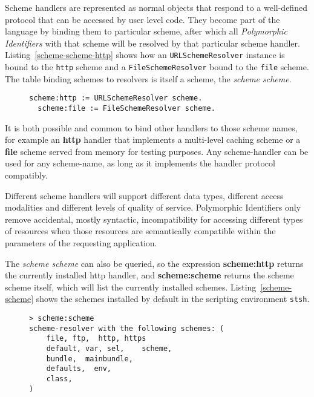 \documentclass[preprint,authoryear]{llncs}
\begin{document}
Scheme handlers are represented as normal objects that respond to a well-defined protocol that can be
accessed by user level code.  They
become part of the language by binding them to particular scheme, after which
all \emph{Polymorphic Identifiers} with that scheme will be resolved by that particular scheme handler.
Listing~\ref{scheme-scheme-http} shows how an {\tt URLSchemeResolver} instance is bound
to the {\tt http} scheme and a {\tt FileSchemeResolver} bound to the {\tt file} scheme.  The table 
binding schemes to resolvers is itself a scheme, the \emph{scheme scheme}.

\begin{figure}[htbp]
\begin{lstlisting}[style=L,label=scheme-scheme-http,caption=Binding scheme handlers to the http and file schemes.]
  scheme:http := URLSchemeResolver scheme.
  scheme:file := FileSchemeResolver scheme.
\end{lstlisting}
\end{figure}

It is both possible and common to bind other handlers to those scheme
names, for example an {\bf http} handler that implements a multi-level caching scheme
or a {\bf file} scheme served from memory for testing purposes.  Any scheme-handler
can be used for any scheme-name, as long as it implements the handler protocol
compatibly.

Different scheme handlers will support different
data types, different access modalities and different levels of quality of service.
Polymorphic Identifiers only remove accidental, mostly syntactic, incompatibility for accessing different types
of resources when those resources are semantically compatible within the parameters
of the requesting application.


The \emph{scheme scheme} can also be queried,
so the expression {\bf scheme:http} returns the currently installed http handler, and 
{\bf scheme:scheme} returns the scheme scheme itself, which will list the currently
installed schemes.  Listing~\ref{scheme-scheme} shows the schemes installed by
default in the scripting environment {\tt stsh}.

\begin{figure}[htbp]
\begin{lstlisting}[style=L,label=scheme-scheme,caption=List of schemes via scheme:scheme.]
> scheme:scheme 
scheme-resolver with the following schemes: (
    file, ftp,  http, https
    default, var, sel,    scheme,
    bundle,  mainbundle,
    defaults,  env,
    class,
)
\end{lstlisting}
\end{figure}
\end{document}
